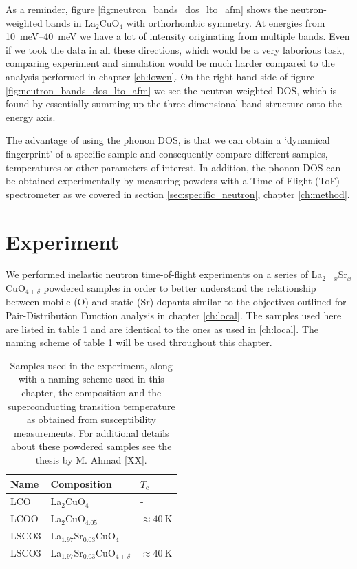 As a reminder, figure \ref{fig:neutron_bands_dos_lto_afm} shows the neutron-weighted bands in La$_2$CuO$_4$ with orthorhombic symmetry. At energies from \SIrange{10}{40}{\milli\eV} we have a lot of intensity originating from multiple bands. Even if we took the data in all these directions, which would be a very laborious task, comparing experiment and simulation would be much harder compared to the analysis performed in chapter \ref{ch:lowen}. On the right-hand side of figure \ref{fig:neutron_bands_dos_lto_afm} we see the neutron-weighted DOS, which is found by essentially summing up the three dimensional band structure onto the energy axis.

The advantage of using the phonon DOS, is that we can obtain a `dynamical fingerprint' of a specific sample and consequently compare different samples, temperatures or other parameters of interest. In addition, the phonon DOS can be obtained experimentally by measuring powders with a Time-of-Flight (ToF) spectrometer as we covered in section \ref{sec:specific_neutron}, chapter \ref{ch:method}.

\section{Experiment}
We performed inelastic neutron time-of-flight experiments on a series of La$_{2-x}$Sr$_{x}$CuO$_{4+\delta}$ powdered samples in order to better understand the relationship between mobile (O) and static (Sr) dopants similar to the objectives outlined for Pair-Distribution Function analysis in chapter \ref{ch:local}. The samples used here are listed in table \ref{tab:in4_samples} and are identical to the ones as used in \ref{ch:local}. The naming scheme of table \ref{tab:in4_samples} will be used throughout this chapter.

\begin{table}
    \caption{Samples used in the experiment, along with a naming scheme used in this chapter, the composition and the superconducting transition temperature as obtained from susceptibility measurements. For additional details about these powdered samples see the thesis by M. Ahmad [XX].}
    \label{tab:in4_samples}
    \centering
    \begin{tabular}{lll}
    \toprule
      Name &                             Composition &                $T_\text{c}$ \\
    \midrule
       LCO &                           La$_2$CuO$_4$ &                           - \\
      LCOO &                      La$_2$CuO$_{4.05}$ &  $\approx \SI{40}{\kelvin}$ \\
     LSCO3 &           La$_{1.97}$Sr$_{0.03}$CuO$_4$ &                           - \\
     LSCO3 &  La$_{1.97}$Sr$_{0.03}$CuO$_{4+\delta}$ &  $\approx \SI{40}{\kelvin}$ \\
    \bottomrule
    \end{tabular}
\end{table}

